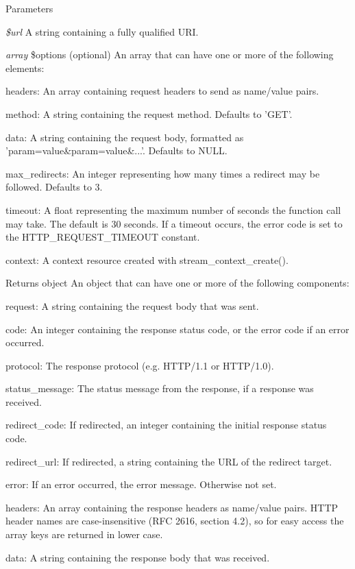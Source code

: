 \begin{DoxyParams}{Parameters}
\item[{\em \$url}]A string containing a fully qualified URI. \item[{\em array}]\$options (optional) An array that can have one or more of the following elements:
\begin{DoxyItemize}
\item headers: An array containing request headers to send as name/value pairs.
\item method: A string containing the request method. Defaults to 'GET'.
\item data: A string containing the request body, formatted as 'param=value\&param=value\&...'. Defaults to NULL.
\item max\_\-redirects: An integer representing how many times a redirect may be followed. Defaults to 3.
\item timeout: A float representing the maximum number of seconds the function call may take. The default is 30 seconds. If a timeout occurs, the error code is set to the HTTP\_\-REQUEST\_\-TIMEOUT constant.
\item context: A context resource created with stream\_\-context\_\-create().
\end{DoxyItemize}\end{DoxyParams}
\begin{DoxyReturn}{Returns}
object An object that can have one or more of the following components:
\begin{DoxyItemize}
\item request: A string containing the request body that was sent.
\item code: An integer containing the response status code, or the error code if an error occurred.
\item protocol: The response protocol (e.g. HTTP/1.1 or HTTP/1.0).
\item status\_\-message: The status message from the response, if a response was received.
\item redirect\_\-code: If redirected, an integer containing the initial response status code.
\item redirect\_\-url: If redirected, a string containing the URL of the redirect target.
\item error: If an error occurred, the error message. Otherwise not set.
\item headers: An array containing the response headers as name/value pairs. HTTP header names are case-\/insensitive (RFC 2616, section 4.2), so for easy access the array keys are returned in lower case.
\item data: A string containing the response body that was received. 
\end{DoxyItemize}
\end{DoxyReturn}
